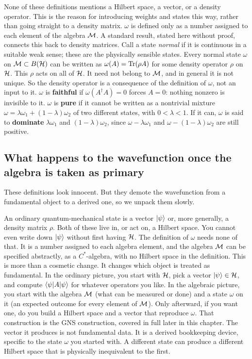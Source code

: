 None of these definitions mentions a Hilbert space, a vector, or a density operator. This is the reason for
introducing weights and states this way, rather than going straight to a density matrix. $\omega$ is defined
only as a number assigned to each element of the algebra $\mathcal{M}$. A standard result, stated here without proof,
connects this back to density matrices. Call a state \emph{normal} if it is continuous in a suitable weak
sense; these are the physically sensible states. Every normal state $\omega$ on $\mathcal{M}\subset B(\mathcal{H})$ can be
written as $\omega(A)=\operatorname{Tr}(\rho A)$ for some density operator $\rho$ on $\mathcal{H}$. This $\rho$ acts on all of
$\mathcal{H}$. It need not belong to $\mathcal{M}$, and in general it is not unique. So the density operator is a consequence
of the definition of $\omega$, not an input to it. $\omega$ is \textbf{faithful} if $\omega(A^\dagger A)=0$
forces $A=0$: nothing nonzero is invisible to it. $\omega$ is \textbf{pure} if it cannot be written as a
nontrivial mixture $\omega=\lambda\omega_1+(1-\lambda)\omega_2$ of two different states, with $0<\lambda<1$. If
it can, $\omega$ is said to \textbf{dominate} $\lambda\omega_1$ and $(1-\lambda)\omega_2$, since
$\omega-\lambda\omega_1$ and $\omega-(1-\lambda)\omega_2$ are still positive.

\subsection*{What happens to the wavefunction once the algebra is taken as primary}

These definitions look innocent. But they demote the wavefunction from a fundamental object to a derived
one, so we unpack them slowly.

An ordinary quantum-mechanical state is a vector $\ket\psi$ or, more generally, a density matrix $\rho$.
Both of these live in, or act on, a Hilbert space. You cannot even write down $\ket\psi$ without first having
$\mathcal{H}$. The definition of $\omega$ needs none of that. It is a number assigned to each algebra element, and
the algebra $\mathcal{M}$ can be specified abstractly, as a $C^*$-algebra, with no Hilbert space in the definition.
This is more than a cosmetic change. It changes which object is treated as fundamental. In the ordinary
picture, you start with $\mathcal{H}$, pick a vector $\ket\psi\in\mathcal{H}$, and compute $\braket{\psi|A|\psi}$ for
whatever operators you like. In the algebraic picture, you start with the algebra $\mathcal{M}$ (what can be measured
or done) and a state $\omega$ on it (an expected outcome for every element of $\mathcal{M}$). Only afterward, if you
want one, do you build a Hilbert space and a vector that reproduce $\omega$. That construction is the GNS
construction, covered in full later in this chapter. The vector it produces is not fundamental data. It is a
derived bookkeeping device, specific to the state $\omega$ you started with. A different state can produce a
different Hilbert space that is physically inequivalent to the first.

